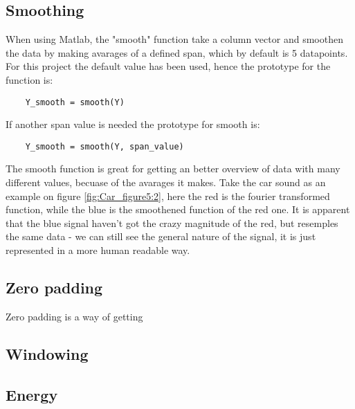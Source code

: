 \subsection{Smoothing}

When using Matlab, the "smooth" function take a column vector and smoothen the data by making avarages of a defined span, which by default is 5 datapoints\cite[smooth]{MATLAB_DOC}. For this project the default value has been used, hence the prototype for the function is:

\begin{verbatim}
	Y_smooth = smooth(Y)
\end{verbatim}

If another span value is needed the prototype for smooth is:


\begin{verbatim}
	Y_smooth = smooth(Y, span_value)
\end{verbatim}

The smooth function is great for getting an better overview of data with many different values, becuase of the avarages it makes. 
Take the car sound as an example on figure \ref{fig:Car_figure5:2}, here the red is the fourier transformed function, while the blue is the smoothened function of the red one. It is apparent that the blue signal haven't got the crazy magnitude of the red, but resemples the same data - we can still see the general nature of the signal, it is just represented in a more human readable way.

\subsection{Zero padding}

Zero padding is a way of getting 

\subsection{Windowing}

\subsection{Energy}